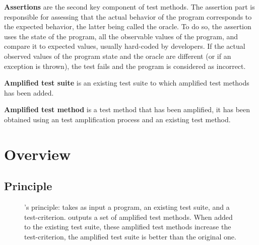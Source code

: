 \textbf{Assertions} are the second key component of test methods. 
The assertion part is responsible for assessing that the actual behavior of the program corresponds to the expected behavior, the latter being called the oracle.
To do so, the assertion uses the state of the program, \ie all the observable values of the program, and compare it to expected values, usually hard-coded by developers.
If the actual observed values of the program state and the oracle are different (or if an exception is thrown), the test fails and the program is considered as incorrect.

\textbf{Amplified test suite} is an existing test suite to which amplified test methods has been added.

\textbf{Amplified test method} is a test method that has been amplified, \ie it has been obtained using an test amplification process and an existing test method.

\section{Overview}
\label{sec:dspot:overview}

\subsection{Principle}
\label{subsec:dspot:overview:principle}

\begin{figure}[h]
	\centering
		\caption{
		\dspot's principle: \dspot takes as input a program, an existing test suite, and a test-criterion. 
		\dspot outputs a set of amplified test methods.
		When added to the existing test suite, these amplified test methods increase the test-criterion, \ie the amplified test suite is better than the original one.
	}
	\label{fig:dspot:principle}
\end{figure}

